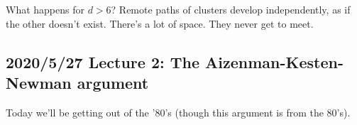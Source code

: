 
What happens for $d>6$? %
Remote paths of clusters develop independently, as if the other doesn't exist. There's a lot of space. They never get to meet. 


\subsection*{2020/5/27 Lecture 2: The Aizenman-Kesten-Newman argument}

%
Today we'll be getting out of the '80's (though this argument is from the 80's). 

